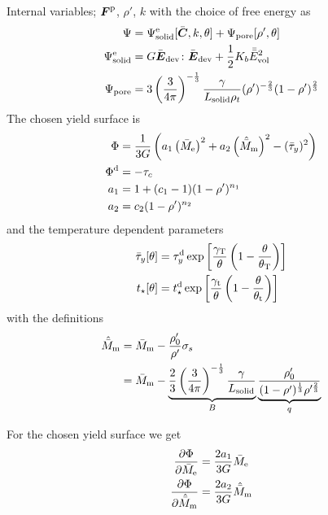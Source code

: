 \documentclass[a4paper,11pt]{article}
\newcommand{\ts}[1]{\text{\boldmath $#1$}}
\newcommand{\pderiv}[2]{\frac{\partial #1}{\partial #2}}
\newcommand{\dev}{{\rm dev}}
\newcommand{\vol}{{\rm vol}}
\newcommand{\rmd}{{\rm d}}
\newcommand{\rme}{{\rm e}}
\newcommand{\rmm}{{\rm m}}
\newcommand{\rmp}{{\rm p}}
\newcommand{\rmT}{{\rm T}}
\newcommand{\rmt}{{\rm t}}
\begin{document}
Internal variables; $\ts F^\rmp$, $\rho'$, $k$ with the choice of free energy as
\begin{align*}
	\Psi &= \Psi_{\rm solid}^\rme[\bar{\ts C},k,\theta] + \Psi_{\rm pore}[\rho',\theta]\\
	\Psi_{\rm solid}^\rme &=  G \bar{\ts E}_\dev\colon\bar{\ts E}_\dev + \frac12 K_b \bar{\bar{E}}_\vol^2\\
	\Psi_{\rm pore} &= 3\left(\frac{3}{4\pi}\right)^{-\frac13} \frac{\gamma}{L_{\rm solid}\rho_t}(\rho')^{-\frac23}(1-\rho')^{\frac23}
\end{align*}
The chosen yield surface is
\begin{align*}
	\Phi &=\frac{1}{3G} \left(a_1\left(\bar{M}_\rme\right)^2 + a_2\left(\hat{\bar M}_\rmm\right)^2 - (\bar\tau_y)^2\right)\\
	\Phi^\rmd &= -\tau_c\\ %
	a_1 &= 1+(c_1-1)(1-\rho')^{n_1}\\
	a_2 &= c_2(1-\rho')^{n_2}
\end{align*}
and the temperature dependent parameters
\begin{align*}
	\bar\tau_y[\theta] &= \tau_y^\rmd \exp\left[\frac{\gamma_\rmT}{\theta}\left(1-\frac{\theta}{\theta_\rmT}\right)\right]\\
	t_\star[\theta] &= t_\star^\rmd \exp\left[\frac{\gamma_\rmt}{\theta}\left(1-\frac{\theta}{\theta_\rmt}\right)\right]
\end{align*}
with the definitions 
\begin{align*}
	\hat{\bar M}_\rmm &= \bar M_\rmm - \frac{\rho_0'}{\rho'}\sigma_s \\
	&= \bar M_\rmm - \underbrace{\frac23\left(\frac{3}{4\pi}\right)^{-\frac13} \frac{\gamma}{L_{\rm solid}}}_{B}\underbrace{\frac{\rho_0'}{(1-\rho')^{\frac13}\rho'^{\frac23}}}_{q}
\end{align*}

For the chosen yield surface we get
\begin{align*}
	\pderiv{\Phi}{\bar M_\rme} &= \frac{2 a_1}{3G}\bar M_\rme\\
	\pderiv{\Phi}{\hat{\bar M}_\rmm} &= \frac{2 a_2}{3G}\hat{\bar M}_\rmm 
\end{align*}
\end{document}
